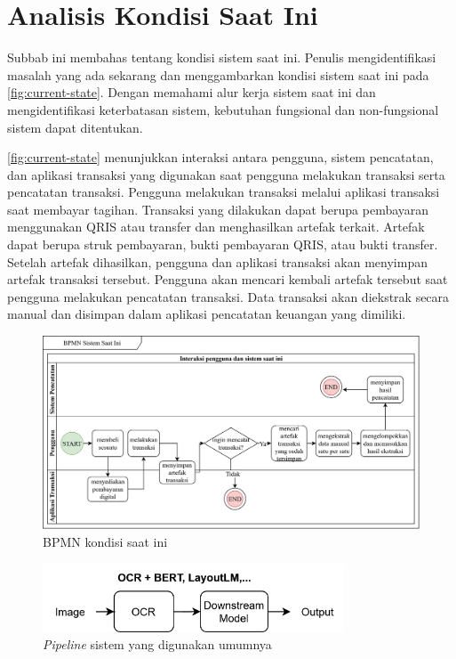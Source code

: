 \section{Analisis Kondisi Saat Ini}
\label{sec:analisis-kondisi-saat-ini}

Subbab ini membahas tentang kondisi sistem saat ini. Penulis mengidentifikasi masalah yang ada sekarang dan menggambarkan kondisi sistem saat ini pada \autoref{fig:current-state}. Dengan memahami alur kerja sistem saat ini dan mengidentifikasi keterbatasan sistem, kebutuhan fungsional dan non-fungsional sistem dapat ditentukan.

\autoref{fig:current-state} menunjukkan interaksi antara pengguna, sistem pencatatan, dan aplikasi transaksi yang digunakan saat pengguna melakukan transaksi serta pencatatan transaksi. Pengguna melakukan transaksi melalui aplikasi transaksi saat membayar tagihan. Transaksi yang dilakukan dapat berupa pembayaran menggunakan QRIS atau transfer dan menghasilkan artefak terkait. Artefak dapat berupa struk pembayaran, bukti pembayaran QRIS, atau bukti transfer. Setelah artefak dihasilkan, pengguna dan aplikasi transaksi akan menyimpan artefak transaksi tersebut. Pengguna akan mencari kembali artefak tersebut saat pengguna melakukan pencatatan transaksi. Data transaksi akan diekstrak secara manual dan disimpan dalam aplikasi pencatatan keuangan yang dimiliki.
\begin{figure}[htbp]
    \centering
    \includegraphics[width=.925\textwidth]{images/current-state.png}
    \caption{BPMN kondisi saat ini}
    \label{fig:current-state}
\end{figure}

\begin{figure}[htbp]
    \centering
    \includegraphics[width=0.8\textwidth]{images/non-donut-pipeline.png}
    \caption{\emph{Pipeline} sistem yang digunakan umumnya}
    \label{fig:non-donut-pipeline}
\end{figure}

